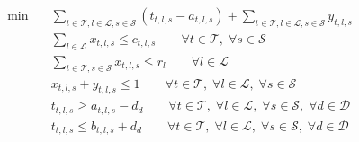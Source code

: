 \begin{align}
  \min\quad & \sum_{t \in \mathcal{T}, l \in \mathcal{L}, s \in \mathcal{S}} (t_{t,l,s} - a_{t,l,s}) + \sum_{t \in \mathcal{T}, l \in \mathcal{L}, s \in \mathcal{S}} y_{t,l,s} \tag{total\_delays} \\
  & \sum_{l \in \mathcal{L}} x_{t,l,s} \le c_{t,l,s} \qquad \forall t \in \mathcal{T},\; \forall s \in \mathcal{S} \tag{capacity} \\
  & \sum_{t \in \mathcal{T}, s \in \mathcal{S}} x_{t,l,s} \le r_{l} \qquad \forall l \in \mathcal{L} \tag{rolling\_stock} \\
  & x_{t,l,s} + y_{t,l,s} \le 1 \qquad \forall t \in \mathcal{T},\; \forall l \in \mathcal{L},\; \forall s \in \mathcal{S} \tag{dispatching} \\
  & t_{t,l,s} \ge a_{t,l,s} - d_{d} \qquad \forall t \in \mathcal{T},\; \forall l \in \mathcal{L},\; \forall s \in \mathcal{S},\; \forall d \in \mathcal{D} \tag{timing} \\
  & t_{t,l,s} \le b_{t,l,s} + d_{d} \qquad \forall t \in \mathcal{T},\; \forall l \in \mathcal{L},\; \forall s \in \mathcal{S},\; \forall d \in \mathcal{D} \tag{timing} \\
\end{align}
